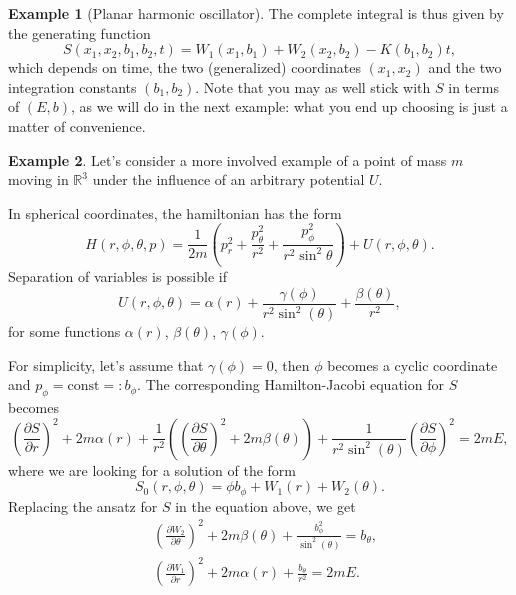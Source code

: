 \documentclass[english,fontsize=11pt,paper=b5]{scrbook}
\theoremstyle{definition}
\newtheorem{example}{Example}[chapter]
\begin{document}
\begin{example}[Planar harmonic oscillator]
      The complete integral is thus given by the generating function
      \begin{equation}
        S(x_1,x_2,b_1,b_2,t) = W_1(x_1, b_1) + W_2(x_2,b_2) - K(b_1, b_2) t,
      \end{equation}
      which depends on time, the two (generalized) coordinates $(x_1, x_2)$ and the two integration constants $(b_1, b_2)$.
      Note that you may as well stick with $S$ in terms of $(E, b)$, as we will do in the next example: what you end up choosing is just a matter of convenience.
    \end{example}

    \begin{example}\label{ex:kepler3dseparable}
      Let's consider a more involved example of a point of mass $m$ moving in $\mathbb{R}^3$ under the influence of an arbitrary potential $U$.

      In spherical coordinates, the hamiltonian has the form
      \begin{equation}
        H(r,\phi,\theta, p) = \frac{1}{2m}\left(p_r^2 + \frac{p_\theta^2}{r^2} + \frac{p_\phi^2}{r^2\sin^2\theta}\right)
        + U(r,\phi,\theta).
      \end{equation}
      Separation of variables is possible if
      \begin{equation}
        U(r,\phi,\theta) = \alpha(r) + \frac{\gamma(\phi)}{r^2 \sin^2(\theta)} + \frac{\beta(\theta)}{r^2},
      \end{equation}
      for some functions $\alpha(r)$, $\beta(\theta)$, $\gamma(\phi)$.

      For simplicity, let's assume that $\gamma(\phi) = 0$, then $\phi$ becomes a cyclic coordinate and $p_\phi = \mathrm{const} =: b_\phi$.
      The corresponding Hamilton-Jacobi equation for $S$ becomes
      \begin{equation}
        \left(\frac{\partial S}{\partial r}\right)^2 + 2m\alpha(r)
        + \frac{1}{r^2}\left(
          \left(\frac{\partial S}{\partial \theta}\right)^2 + 2m\beta(\theta)
        \right)
        + \frac{1}{r^2\sin^2(\theta)}\left(\frac{\partial S}{\partial \phi}\right)^2 = 2mE,
      \end{equation}
      where we are looking for a solution of the form
      \begin{equation}
        S_0(r,\phi,\theta) = \phi b_\phi + W_1(r) + W_2(\theta).
      \end{equation}
      Replacing the ansatz for $S$ in the equation above, we get
      \begin{align}
     & \left(\frac{\partial W_2}{\partial \theta}\right)^2 + 2m \beta(\theta) + \frac{b_\phi^2}{\sin^2(\theta)} = b_\theta, \\
     & \left(\frac{\partial W_1}{\partial r}\right)^2 + 2m \alpha(r) + \frac{b_\theta}{r^2} = 2mE.
      \end{align}


\end{example}
\end{document}
